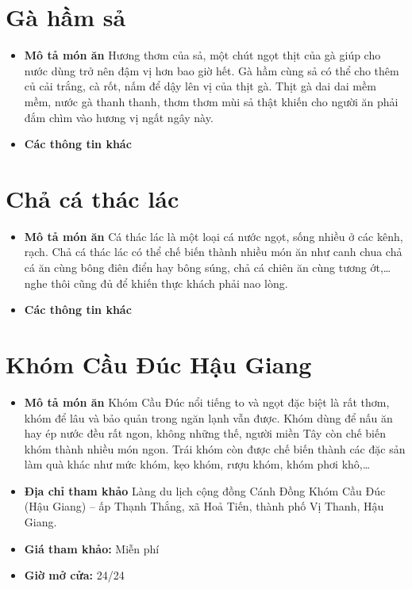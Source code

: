 \documentclass{article}
\begin{document}
\section{Gà hầm sả}
\begin{itemize}
    \item{\textbf{Mô tả món ăn}} Hương thơm của sả, một chút ngọt thịt của gà giúp cho nước dùng trở nên đậm vị hơn bao giờ hết. Gà hầm cùng sả có thể cho thêm củ cải trắng, cà rốt, nấm để dậy lên vị của thịt gà. Thịt gà dai dai mềm mềm, nước gà thanh thanh, thơm thơm mùi sả thật khiến cho người ăn phải đắm chìm vào hương vị ngất ngây này.
    \item{\textbf{Các thông tin khác}}
\end{itemize}

\section{Chả cá thác lác}
\begin{itemize}
    \item{\textbf{Mô tả món ăn}} Cá thác lác là một loại cá nước ngọt, sống nhiều ở các kênh, rạch. Chả cá thác lác có thể chế biến thành nhiều món ăn như canh chua chả cá ăn cùng bông điên điển hay bông súng, chả cá chiên ăn cùng tương ớt,… nghe thôi cũng đủ để khiến thực khách phải nao lòng.
    \item{\textbf{Các thông tin khác}}
\end{itemize}

\section{Khóm Cầu Đúc Hậu Giang}
\begin{itemize}
    \item{\textbf{Mô tả món ăn}} Khóm Cầu Đúc nổi tiếng to và ngọt đặc biệt là rất thơm, khóm để lâu và bảo quản trong ngăn lạnh vẫn được. Khóm dùng để nấu ăn hay ép nước đều rất ngon, không những thế, người miền Tây còn chế biến khóm thành nhiều món ngon. Trái khóm còn được chế biến thành các đặc sản làm quà khác như mức khóm, kẹo khóm, rượu khóm, khóm phơi khô,…
    \item{\textbf{Địa chỉ tham khảo}} Làng du lịch cộng đồng Cánh Đồng Khóm Cầu Đúc (Hậu Giang) – ấp Thạnh Thắng, xã Hoả Tiến, thành phố Vị Thanh, Hậu Giang.
    \item{\textbf{Giá tham khảo:}} Miễn phí
    \item{\textbf{Giờ mở cửa:}} 24/24
\end{itemize}
\end{document}
